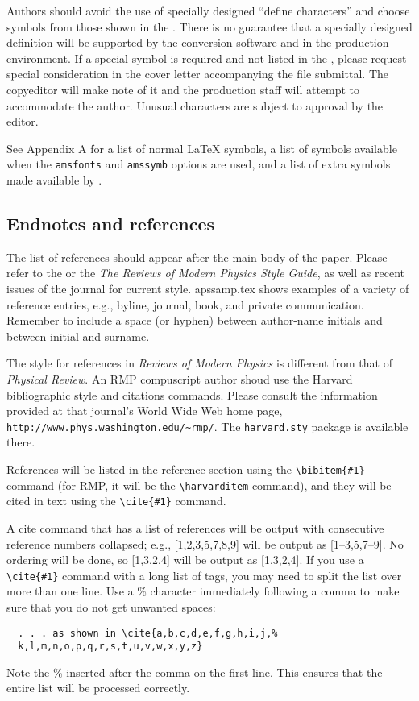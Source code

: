 Authors should avoid the use of specially designed ``define characters''
and choose symbols from those shown in the \LUG{}. There is no guarantee
that a specially designed definition will be supported by the
conversion software and in the production environment. If a special symbol is required and not listed
in the \LUG, please request special consideration in the cover letter
accompanying the file submittal.  The copyeditor will make note of it and
the production staff will attempt to accommodate the author.  Unusual
characters are subject to approval by the editor.

See Appendix A for a list of normal \LaTeX{} symbols, a list of symbols
available when the \verb+amsfonts+ and \verb+amssymb+ options are used, and
a list of extra symbols made available by \REVTeX.

\subsection{Endnotes and references}
\label{sec:endnotes}

The list of references should appear after the main body of the paper. 
Please refer to the \SNG{} or the {\em The Reviews of Modern Physics
Style Guide}, as well as recent issues of the journal for
current style. apssamp.tex shows examples of a variety of reference
entries, e.g., byline, journal, book, and private communication. Remember
to include a space (or hyphen) between author-name initials and between
initial and surname.

The style for references in {\em Reviews of Modern Physics} is
different from that of {\em Physical Review}. An RMP compuscript
author shoud use the Harvard bibliographic style and citations
commands. Please consult the information provided at that journal's
World Wide Web home page, \verb+http://www.phys.washington.edu/~rmp/+. The
\verb+harvard.sty+ package is available there. 

References will be listed in the reference section using the
\verb+\bibitem{#1}+ command (for RMP, it will be the
\verb+\harvarditem+ command), and they will be cited in text using the
\verb+\cite{#1}+ command.

A cite command that has a list of references will be output with
consecutive reference numbers collapsed; e.g., [1,2,3,5,7,8,9] will be
output as [1--3,5,7--9]. No ordering will be done, so [1,3,2,4] will be
output as [1,3,2,4]. If you use a \verb+\cite{#1}+ command with a long list
of tags, you may need to split the list over more than one line. Use a \%
character immediately following a comma to make sure that you do not get
unwanted spaces:
\begin{verbatim}
  . . . as shown in \cite{a,b,c,d,e,f,g,h,i,j,%
  k,l,m,n,o,p,q,r,s,t,u,v,w,x,y,z}
\end{verbatim}
Note the \% inserted after the comma on the first line. This ensures that
the entire list will be processed correctly.

